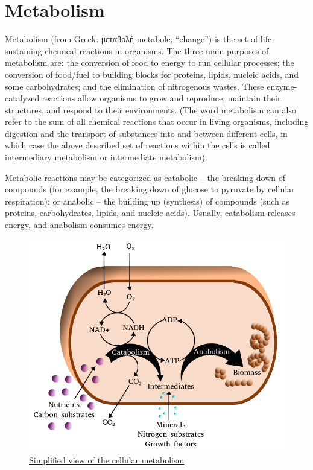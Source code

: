 \hypertarget{metabolism}{%
\section{Metabolism}\label{metabolism}}

Metabolism (from Greek: μεταβολή metabolē, ``change'') is the set of life-sustaining chemical reactions in organisms. The three main purposes of metabolism are: the conversion of food to energy to run cellular processes; the conversion of food/fuel to building blocks for proteins, lipids, nucleic acids, and some carbohydrates; and the elimination of nitrogenous wastes. These enzyme-catalyzed reactions allow organisms to grow and reproduce, maintain their structures, and respond to their environments. (The word metabolism can also refer to the sum of all chemical reactions that occur in living organisms, including digestion and the transport of substances into and between different cells, in which case the above described set of reactions within the cells is called intermediary metabolism or intermediate metabolism).

Metabolic reactions may be categorized as catabolic -- the breaking down of compounds (for example, the breaking down of glucose to pyruvate by cellular respiration); or anabolic -- the building up (synthesis) of compounds (such as proteins, carbohydrates, lipids, and nucleic acids). Usually, catabolism releases energy, and anabolism consumes energy.



\begin{figure}

{\centering \includegraphics[width=0.7\linewidth]{./figures/bioenergetics/Metabolism} 

}

\caption{\href{https://commons.wikimedia.org/wiki/File:Metabolism.png}{Simplified view of the cellular metabolism}}\label{fig:simpleviewmet}
\end{figure}

